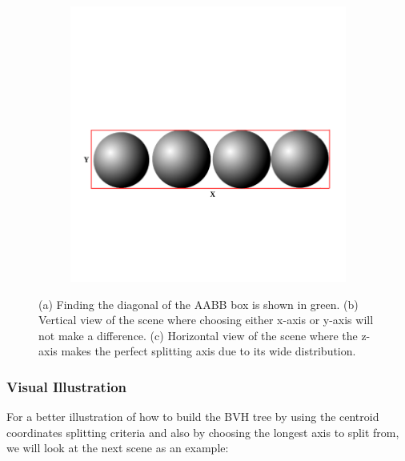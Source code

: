 \documentclass[11pt,a4paper]{article}
\begin{document}
\begin{figure}[H]
\begin{subfigure}[t]{0.3\textwidth}
         \caption{}
         \label{fig:pi_5000}
     \end{subfigure}
     \hfill
     \begin{subfigure}[t]{0.3\textwidth}
         \centering
         \includegraphics[width=\textwidth]{images/LONGAXIS_Z.png}
         \caption{}
         \label{fig:pi_18000}
     \end{subfigure}
        \captionsetup{justification=centering,margin=2cm}
        \caption{(a) Finding the diagonal of the AABB box is shown in green. (b) Vertical view of the scene where choosing either x-axis or y-axis will not make a difference. (c) Horizontal view of the scene where the z-axis makes the perfect splitting axis due to its wide distribution.}
        \label{fig:aabbexample}
\end{figure}

\subsubsection{Visual Illustration}
For a better illustration of how to build the BVH tree by using the centroid coordinates splitting criteria and also by choosing the longest axis to split from, we will look at the next scene as an example: 
\end{document}
